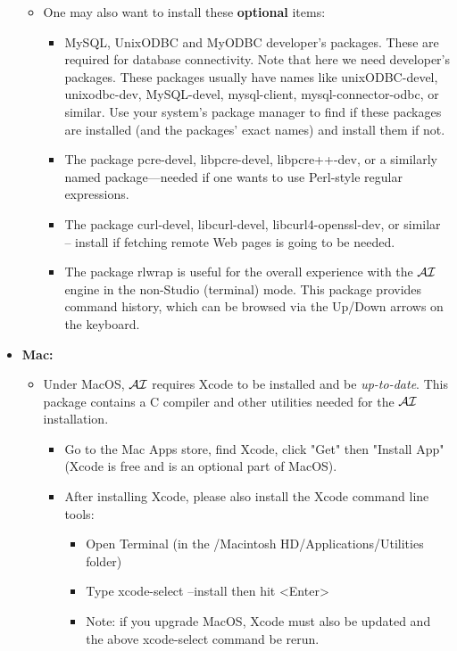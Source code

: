 \documentclass[11pt]{article}
\newcommand{\ERGOAI}{\mbox{\smaller{\ensuremath{\cal{E}}\smaller{{\sc{RGO}}}}\ensuremath{\cal{AI}}}\xspace}
\begin{document}
\begin{itemize}
\begin{itemize}
  \item  One may also want to install these \textbf{optional} items:
    \begin{itemize}
    \item MySQL, UnixODBC and MyODBC developer's packages. These are required
      for database connectivity. Note that here we need developer's
      packages. These packages usually have names like unixODBC-devel,
      unixodbc-dev, MySQL-devel, mysql-client, mysql-connector-odbc, or
      similar.  Use your system's package manager to find if these packages are
      installed (and the packages' exact names) and install them if not.
    \item The package pcre-devel, libpcre-devel, libpcre++-dev, or a similarly
      named package---needed if one wants to use Perl-style regular
      expressions.
    \item The package curl-devel, libcurl-devel, libcurl4-openssl-dev, or
      similar -- install if fetching remote Web pages is going to be needed.
    \item The package rlwrap is useful for the overall experience with the
      \ERGOAI engine in the non-Studio (terminal) mode. This package provides
      command history, which can be browsed via the Up/Down arrows on the
      keyboard.
    \end{itemize}
  \end{itemize}
\item[] \textbf{Mac:}
  \begin{itemize}
  \item Under MacOS, \ERGOAI requires Xcode to be installed and be
    \emph{up-to-date}.  This package contains a C compiler and other
    utilities needed for the \ERGOAI installation.
    \begin{itemize}
    \item Go to the Mac Apps store, find Xcode, click "Get" then "Install
      App" (Xcode is free and is an optional part of MacOS).
    \item After installing Xcode, please also install the Xcode command
      line tools:
      \begin{itemize}
      \item Open Terminal (in the /Macintosh HD/Applications/Utilities
        folder)
      \item Type xcode-select --install then hit <Enter>
      \item Note: if you upgrade MacOS, Xcode must also be updated and the
        above xcode-select command be rerun.

\end{itemize}
\end{itemize}
\end{itemize}
\end{itemize}
\end{document}

